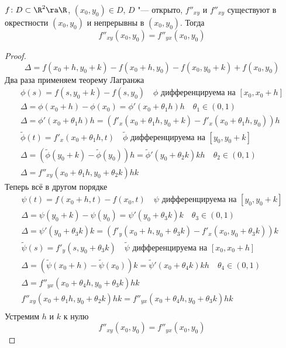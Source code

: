 \begin{theorem}
	$f\colon D \subset \R^2 \ra \R$, $(x_0, y_0) \in D$, $D$ "--- открыто, $f''_{xy}$ и $f''_{xy}$ существуют в окрестности $(x_0, y_0)$ и непрерывны в $(x_0, y_0)$.
	Тогда
	\[ f''_{xy} (x_0, y_0) = f''_{yx} (x_0, y_0) \]
\end{theorem}
\begin{proof}
	\[ \Delta = f(x_0 + h, y_0 + k) - f(x_0 + h, y_0) - f(x_0, y_0 + k) + f(x_0, y_0) \]
	Два раза применяем теорему Лагранжа
	\begin{gather*}
		\phi(s) = f(s, y_0 + k) - f(s, y_0) \quad \text{$\phi$ дифференцируема на $[x_0, x_0 + h]$} \\
		\Delta = \phi(x_0 + h) - \phi(x_0) = \phi'(x_0 + \theta_1 h) h \quad \theta_1 \in (0, 1) \\
		\Delta = \phi'(x_0 + \theta_1 h) h = (f'_x(x_0 + \theta_1 h, y_0 + k) - f'_x(x_0 + \theta_1 h, y_0)) h \\
		\tilde \phi(t) = f'_x(x_0 + \theta_1 h, t) \quad \text{$\tilde \phi$ дифференцируема на $[y_0, y_0 + k]$} \\
		\Delta = (\tilde \phi(y_0 + k) - \tilde \phi(y_0)) h = \tilde \phi' (y_0 + \theta_2 k) kh \quad \theta_2 \in (0, 1) \\
		\Delta = f''_{xy} (x_0 + \theta_1 h, y_0 + \theta_2 k) hk
	\end{gather*}
	Теперь всё в другом порядке
	\begin{gather*}
		\psi(t) = f(x_0 + h, t) - f(x_0, t) \quad \text{$\psi$ дифференцируема на $[y_0, y_0 + k]$} \\
		\Delta = \psi(y_0 + k) - \psi(y_0) = \psi'(y_0 + \theta_3 k) k \quad \theta_3 \in (0, 1) \\
		\Delta = \psi'(y_0 + \theta_3 k) k = (f'_y(x_0 + h, y_0 + \theta_3 k) - f'_x(x_0, y_0 + \theta_3 k)) k \\
		\tilde \psi(s) = f'_y(s, y_0 + \theta_3 k) \quad \text{$\tilde \psi$ дифференцируема на $[x_0, x_0 + h]$} \\
		\Delta = (\tilde \psi(x_0 + h) - \tilde \psi(x_0)) k = \tilde \psi' (x_0 + \theta_4 k) kh \quad \theta_4 \in (0, 1) \\
		\Delta = f''_{yx} (x_0 + \theta_4 h, y_0 + \theta_3 k) hk \\
		f''_{xy} (x_0 + \theta_1 h, y_0 + \theta_2 k) hk = f''_{yx} (x_0 + \theta_4 h, y_0 + \theta_3 k) hk \\
	\end{gather*}
	Устремим $h$ и $k$ к нулю
	\[ f''_{xy} (x_0, y_0) = f''_{yx} (x_0, y_0) \]
\end{proof}

